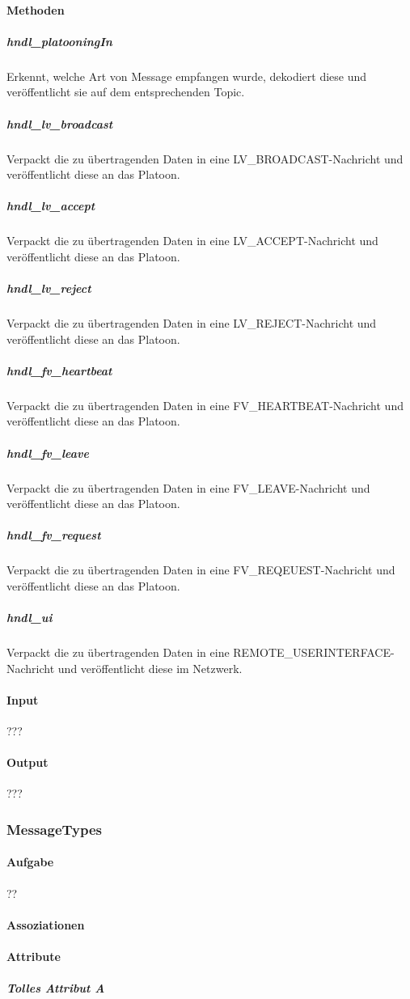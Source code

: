 \documentclass[a4paper, 12pt, titlepage]{scrartcl}
\begin{document}
				\paragraph{Methoden}
                    \subparagraph{hndl\_platooningIn} Erkennt, welche Art von Message empfangen wurde, dekodiert diese und veröffentlicht sie auf dem entsprechenden Topic. 
					\subparagraph{hndl\_lv\_broadcast} Verpackt die zu übertragenden Daten in eine LV\_BROADCAST-Nachricht und veröffentlicht diese an das Platoon. 
					\subparagraph{hndl\_lv\_accept} Verpackt die zu übertragenden Daten in eine LV\_ACCEPT-Nachricht und veröffentlicht diese an das Platoon.
					\subparagraph{hndl\_lv\_reject} Verpackt die zu übertragenden Daten in eine LV\_REJECT-Nachricht und veröffentlicht diese an das Platoon.
                	\subparagraph{hndl\_fv\_heartbeat} Verpackt die zu übertragenden Daten in eine FV\_HEARTBEAT-Nachricht und veröffentlicht diese an das Platoon.
                    \subparagraph{hndl\_fv\_leave} Verpackt die zu übertragenden Daten in eine FV\_LEAVE-Nachricht und veröffentlicht diese an das Platoon.
                	\subparagraph{hndl\_fv\_request} Verpackt die zu übertragenden Daten in eine FV\_REQEUEST-Nachricht und veröffentlicht diese an das Platoon.
                	\subparagraph{hndl\_ui} Verpackt die zu übertragenden Daten in eine REMOTE\_USERINTERFACE-Nachricht und veröffentlicht diese im Netzwerk. 
				\paragraph{Input} ???
				\paragraph{Output} ???

			\subsubsection{MessageTypes}
			\label{messages_types}
				\paragraph{Aufgabe} ??
				\paragraph{Assoziationen}
				\paragraph{Attribute}
					\subparagraph{Tolles Attribut A}
\end{document}

